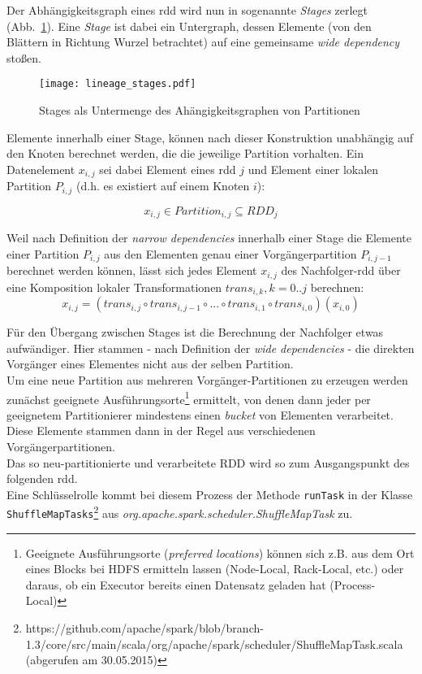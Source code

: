Der Abhängigkeitsgraph eines \gls{rdd} wird nun in sogenannte \textit{Stages} zerlegt (Abb.~\ref{fig:lineage_stages}). Eine \textit{Stage} ist dabei ein Untergraph, dessen Elemente (von den Blättern in Richtung Wurzel betrachtet) auf eine gemeinsame \textit{wide dependency} stoßen.\\

\begin{figure}[ht!]
	\centering
  \texttt{[image: lineage\_stages.pdf]}
	\caption{Stages als Untermenge des Ahängigkeitsgraphen von Partitionen}
	\label{fig:lineage_stages}
\end{figure}

Elemente innerhalb einer Stage, können nach dieser Konstruktion unabhängig auf den Knoten berechnet werden, die die jeweilige Partition vorhalten. Ein Datenelement \(x_{i,j}\) sei dabei Element eines \gls{rdd} \(j\) und Element einer lokalen Partition \(P_{i,j}\) (d.h. es existiert auf einem Knoten \(i\)):

\[x_{i,j} \in Partition_{i,j} \subseteq RDD_j\]

Weil nach Definition der \textit{narrow dependencies} innerhalb einer Stage die Elemente einer Partition \(P_{i,j}\) aus den Elementen genau einer Vorgängerpartition \(P_{i,j-1}\) berechnet werden können, lässt sich jedes Element \(x_{i,j}\) des Nachfolger-\gls{rdd} über eine Komposition lokaler Transformationen \(trans_{i,k}, k = 0..j\) berechnen:\\ 

\[x_{i,j} = (trans_{i,j} \circ trans_{i,j-1} \circ ... \circ trans_{i,1}\circ trans_{i,0})(x_{i,0})\]

Für den Übergang zwischen Stages ist die Berechnung der Nachfolger etwas aufwändiger. Hier stammen - nach Definition der \textit{wide dependencies} - die direkten Vorgänger eines Elementes nicht aus der selben Partition.\\

Um eine neue Partition aus mehreren Vorgänger-Partitionen zu erzeugen werden zunächst geeignete Ausführungsorte\footnote{Geeignete Ausführungsorte (\textit{preferred locations}) können sich z.B. aus dem Ort eines Blocks bei HDFS ermitteln lassen (Node-Local, Rack-Local, etc.) oder daraus, ob ein Executor bereits einen Datensatz geladen hat (Process-Local)} ermittelt, von denen dann jeder per geeignetem Partitionierer mindestens einen \textit{bucket} von Elementen verarbeitet. Diese Elemente stammen dann in der Regel aus verschiedenen Vorgängerpartitionen.\\
Das so neu-partitionierte und verarbeitete \gls{RDD} wird so zum Ausgangspunkt des folgenden \gls{rdd}.\\
Eine Schlüsselrolle kommt bei diesem Prozess der Methode \lstinline|runTask| in der Klasse 
\lstinline|ShuffleMapTasks|\footnote{https://github.com/apache/spark/blob/branch-1.3/core/src/main/scala/org/apache/spark/scheduler/ShuffleMapTask.scala (abgerufen am 30.05.2015)} aus \textit{org.apache.spark.scheduler.ShuffleMapTask} zu.\\

